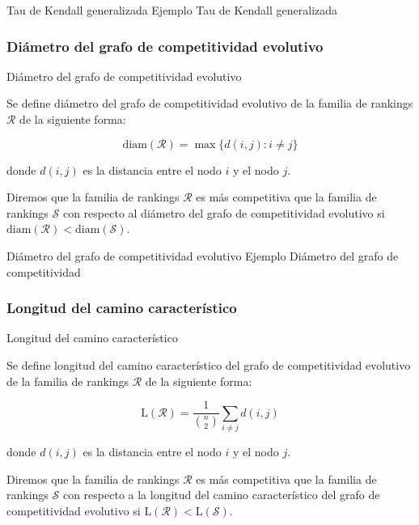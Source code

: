 \documentclass[11pt]{beamer}
\begin{document}
	\begin{frame}{Tau de Kendall generalizada}
		Ejemplo	Tau de Kendall generalizada
	\end{frame}
	
	\subsubsection{Diámetro del grafo de competitividad evolutivo}
	
	\begin{frame}{Diámetro del grafo de competitividad evolutivo}
		\begin{defi}
			Se define diámetro del grafo de competitividad evolutivo de la familia de rankings $\mathcal{R}$ de la siguiente forma:
			
			\begin{equation}
			\mathrm{diam}(\mathcal{R}) = \max \{ d(i,j) : i \neq j \}
			\end{equation}
			
			donde $d(i,j)$ es la distancia entre el nodo $i$ y el nodo $j$.
		\end{defi}
		
		\begin{defi}
			Diremos que la familia de rankings $\mathcal{R}$ es más competitiva que la familia de rankings $\mathcal{S}$ con respecto al diámetro del grafo de competitividad evolutivo si $\mathrm{diam}(\mathcal{R}) < \mathrm{diam}(\mathcal{S})$.
		\end{defi}
	\end{frame}
	
	\begin{frame}{Diámetro del grafo de competitividad evolutivo}
		Ejemplo	Diámetro del grafo de competitividad
	\end{frame}
	
	\subsubsection{Longitud del camino característico}
	
	\begin{frame}{Longitud del camino característico}
		\begin{defi}
			Se define longitud del camino característico del grafo de competitividad evolutivo de la familia de rankings $\mathcal{R}$ de la siguiente forma:
			
			\begin{equation}
			\mathrm{L}(\mathcal{R}) = \dfrac{1}{\binom{n}{2}} \sum_{i\neq j} d(i,j)
			\end{equation}
			
			donde $d(i,j)$ es la distancia entre el nodo $i$ y el nodo $j$.
		\end{defi}
		
		\begin{defi}
			Diremos que la familia de rankings $\mathcal{R}$ es más competitiva que la familia de rankings $\mathcal{S}$ con respecto a la longitud del camino característico del grafo de competitividad evolutivo si $\mathrm{L}(\mathcal{R}) < \mathrm{L}(\mathcal{S})$.
		\end{defi}
	\end{frame}
	
\end{document}
